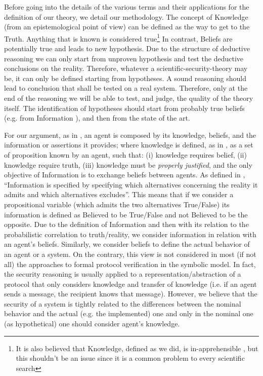 Before going into the details of the various terms and their applications for
the definition of our theory, we 
detail our methodology.
The concept of Knowledge \autocite{Hintikka1962knowledge} (from an
epistemological point of view) can be defined as the way to get to the Truth.
Anything that is known is considered true\footnote{It is also
believed that Knowledge, defined as we did, is in-apprehensible \autocite{Empiricus1990Pyrrhonism}, but this shouldn't be an issue since it is a common problem to every scientific search}
In contrast, Beliefs \autocite{Hintikka1962knowledge} are potentially true and
leads to new hypothesis. Due to the
structure of deductive reasoning we can only start from unproven hypothesis and test the
deductive conclusions on the reality. Therefore, whatever a scientific-security-theory may be,
it can only be defined starting from hypotheses.  A sound reasoning should lead to
conclusion that shall be tested on a real system. Therefore, only at the end of
the reasoning we will be able to test, and judge, the quality of the theory
itself. The identification of hypotheses should start from probably true
beliefs (e.g. from Information \autocite{Hintikka1993Information}), and then from the state of the art.

For our argument, 
as in \autocite{Santaca2016abf}, an agent is composed by its knowledge, beliefs, and the information or assertions
it provides; where knowledge is defined, as in \autocite{Steup2020epistemology}, as
a set of proposition known by an agent, such that: (i) knowledge requires belief,
(ii) knowledge require truth, (iii) knowledge must be \emph{properly justified}, and
the only objective of Information is to exchange beliefs between agents.
As defined in \autocite{Hintikka1993Information}, ``Information is specified by specifying
which alternatives concerning the reality it admits and which alternatives
excludes''. This means that if we consider a propositional
variable (which admits the two alternatives True/False) its information is
defined as Believed to be True/False and not Believed to be the opposite. 
Due to the definition of Information and then with its relation to the probabilistic
correlation to truth/reality, we consider
information in relation with an agent's beliefs. Similarly, we consider
beliefs to define the actual behavior of an agent or a system. On the 
contrary, this view is not considered in most (if not all) the approaches to formal protocol verification
in the symbolic model. In fact, the security reasoning is usually applied to a representation/abstraction
of a protocol that only considers knowledge and transfer of knowledge (i.e.
if an agent sends a message, the recipient knows that message). However,
we believe that the security of a system is tightly related to the differences between
the nominal behavior and the actual (e.g. the implemented) one and only in the
nominal one (as hypothetical) one should consider agent's knowledge.

